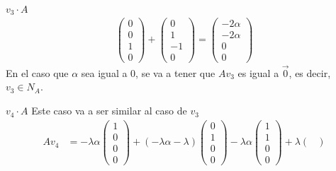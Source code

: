 \documentclass{article}
\begin{document}
\begin{enumerate}
\begin{mathcase}{\(v_3 \cdot A\)}
\[\begin{aligned}
\begin{pmatrix}
                        0 \\ 0 \\ 1 \\ 0
                    \end{pmatrix}
                    +
                    \begin{pmatrix}
                        0 \\ 1 \\ -1 \\ 0
                    \end{pmatrix} 
                    = 
                    \begin{pmatrix}
                        -2\alpha \\ -2\alpha \\ 0 \\ 0
                    \end{pmatrix}
                \end{aligned}
            \]
            En el caso que \(\alpha\) sea igual a 0, se va a tener que \(Av_3\) es igual a \(\vec{0}\), 
            es decir, \(v_3 \in N_{A}\).
        \end{mathcase}
        \begin{mathcase}{\(v_4 \cdot A\)}
            Este caso va a ser similar al caso de \(v_3\)
            \[
                \begin{aligned}
                    Av_4 &= 
                    -\lambda\alpha
                    \begin{pmatrix}
                        1 \\ 0 \\ 0 \\ 0
                    \end{pmatrix}
                    +(-\lambda\alpha - \lambda)
                    \begin{pmatrix}
                        0 \\ 1 \\ 0 \\ 0
                    \end{pmatrix}
                    -\lambda\alpha
                    \begin{pmatrix}
                        1 \\ 1 \\ 0 \\ 0
                    \end{pmatrix}
                    +\lambda
                    \begin{pmatrix}

\end{pmatrix}
\end{aligned}\]
\end{mathcase}
\end{enumerate}
\end{document}
